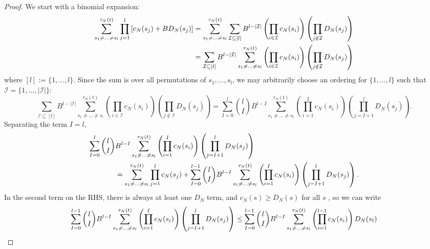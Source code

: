 \documentclass{article}
\newcommand{\1}[1]{\mathbbm{1}_{#1}}
\begin{document}
\begin{proof}
We start with a binomial expansion:
\begin{align}
\sum_{s_1\neq\dots\neq s_l}^{\tau_N(t)} \prod_{j=1}^l 
        \left[ c_N(s_j) + B D_N(s_j) \right]
&= \sum_{s_1\neq\dots\neq s_l}^{\tau_N(t)} \sum_{\mathcal{I} \subseteq [l]}
        B^{l-|\mathcal{I}|} \left( \prod_{i\in\mathcal{I}} c_N(s_i) \right)
        \left( \prod_{j\notin\mathcal{I}} D_N(s_j) \right) \notag\\
&= \sum_{\mathcal{I} \subseteq [l]} B^{l-|\mathcal{I}|}
        \sum_{s_1\neq\dots\neq s_l}^{\tau_N(t)}
        \left( \prod_{i\in\mathcal{I}} c_N(s_i) \right)
        \left( \prod_{j\notin\mathcal{I}} D_N(s_j) \right) \label{eq:010}
\end{align}
where $[l] := \{1,\dots,l\}$. Since the sum is over all permutations of $s_1,\dots,s_l$, we may arbitrarily choose an ordering for $\{1,\dots,l\}$ such that $\mathcal{I} = \{ 1,\dots, |\mathcal{I}| \}$:
\begin{equation}
\sum_{\mathcal{I} \subseteq [l]} B^{l-|\mathcal{I}|}
        \sum_{s_1\neq\dots\neq s_l}^{\tau_N(t)}
        \left( \prod_{i\in\mathcal{I}} c_N(s_i) \right)
        \left( \prod_{j\notin\mathcal{I}} D_N(s_j) \right)
= \sum_{I=0}^l \binom{l}{I} B^{l-I} \sum_{s_1\neq\dots\neq s_l}^{\tau_N(t)}
        \left( \prod_{i=1}^I c_N(s_i) \right)
        \left( \prod_{j=I+1}^l D_N(s_j) \right) .
\end{equation}
Separating the term $I=l$,
\begin{align}
\sum_{I=0}^l \binom{l}{I} &B^{l-I} \sum_{s_1\neq\dots\neq s_l}^{\tau_N(t)}
        \left( \prod_{i=1}^I c_N(s_i) \right)
        \left( \prod_{j=I+1}^l D_N(s_j) \right) \notag\\
&= \sum_{s_1\neq\dots\neq s_l}^{\tau_N(t)} \prod_{j=1}^l c_N(s_j)
+ \sum_{I=0}^{l-1} \binom{l}{I} B^{l-I} 
        \sum_{s_1\neq\dots\neq s_l}^{\tau_N(t)}
        \left( \prod_{i=1}^I c_N(s_i) \right) \left( \prod_{j=I+1}^l D_N(s_j) \right). \label{eq:012}
\end{align}
In the second term on the RHS, there is always at least one $D_N$ term, and $c_N(s) \geq D_N(s)$ for all $s$ \citep[p.9]{koskela2018}, so we can write
\begin{align}
\sum_{I=0}^{l-1}\binom{l}{I} B^{l-I} \sum_{s_1\neq\dots\neq s_l}^{\tau_N(t)}
        \left( \prod_{i=1}^I c_N(s_i) \right) \left( \prod_{j=I+1}^l D_N(s_j) \right)
&\leq \sum_{I=0}^{l-1}\binom{l}{I} B^{l-I} 
        \sum_{s_1\neq\dots\neq s_l}^{\tau_N(t)}
        \left( \prod_{i=1}^{l-1} c_N(s_i) \right) D_N(s_l) \notag\\

\end{align}
\end{proof}
\end{document}
